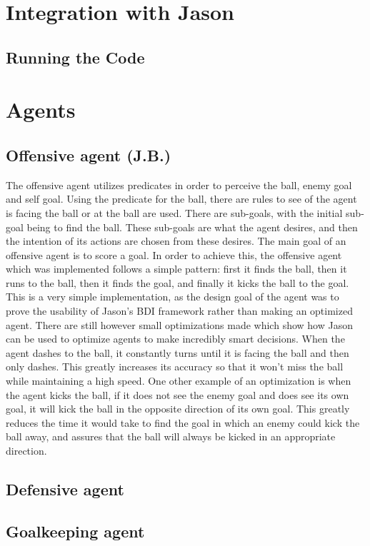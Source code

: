 \documentclass[conference]{IEEEtran}
\begin{document}
\section{Integration with Jason}
\subsection{Running the Code}

\section{Agents}
\subsection{Offensive agent (J.B.)}
The offensive agent utilizes predicates in order to perceive the ball, enemy goal and self goal.
Using the predicate for the ball, there are rules to see of the agent is facing the ball or at the ball are used.
There are sub-goals, with the initial sub-goal being to find the ball.
These sub-goals are what the agent desires, and then the intention of its actions are chosen from these desires.
The main goal of an offensive agent is to score a goal.
In order to achieve this, the offensive agent which was implemented follows a simple pattern: first it finds the ball, then it runs to the ball, then it finds the goal, and finally it kicks the ball to the goal.
This is a very simple implementation, as the design goal of the agent was to prove the usability of Jason's BDI framework rather than making an optimized agent.
There are still however small optimizations made which show how Jason can be used to optimize agents to make incredibly smart decisions.
When the agent dashes to the ball, it constantly turns until it is facing the ball and then only dashes.
This greatly increases its accuracy so that it won't miss the ball while maintaining a high speed.
One other example of an optimization is when the agent kicks the ball, if it does not see the enemy goal and does see its own goal, it will kick the ball in the opposite direction of its own goal.
This greatly reduces the time it would take to find the goal in which an enemy could kick the ball away, and assures that the ball will always be kicked in an appropriate direction.

\subsection{Defensive agent}
\subsection{Goalkeeping agent}
\end{document}
